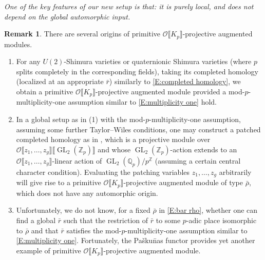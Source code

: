 \documentclass[12pt]{amsart}
\theoremstyle{definition}
\newtheorem{remark}[subsection]{Remark}
\numberwithin{equation}{subsection}
\def\calO{\mathcal{O}}
\def\QQ{\mathbb{Q}}
\def\ZZ{\mathbb{Z}}
\DeclareMathOperator{\GL}{GL}
\begin{document}
{\it One of the key features of our new setup is that: it is purely local, and does not depend on the global automorphic input.}
\begin{remark}
\label{R:origins of arithmetic modules}
There are several origins of primitive $\calO\llbracket K_p\rrbracket$-projective augmented modules.
\begin{enumerate}
\item For any $U(2)$-Shimura varieties or quaternionic Shimura varieties (where $p$ splits completely in the corresponding fields), taking its completed homology (localized at an appropriate $\bar r$) similarly to \eqref{E:completed homology}, we obtain a primitive $\calO\llbracket K_p\rrbracket$-projective augmented module provided a mod-$p$-multiplicity-one assumption similar to \eqref{E:multiplicity one} hold.

\item 
In a global setup as in (1) with the mod-$p$-multiplicity-one assumption, assuming some further Taylor--Wiles conditions, one may construct a patched completed homology as in \cite[\S\,2]{six author}, which is a projective module over $\calO\llbracket z_1, \dots, z_g\rrbracket \llbracket \GL_2(\ZZ_p)\rrbracket$ and whose $\GL_2(\ZZ_p)$-action extends to an $\calO\llbracket z_1, \dots, z_g\rrbracket$-linear action of $\GL_2(\QQ_p)/p^\ZZ$ (assuming a certain central character condition). Evaluating the patching variables $z_1, \dots, z_g$ arbitrarily will give rise to a primitive $\calO\llbracket K_p\rrbracket$-projective augmented module of type $\bar\rho$, which does not have any automorphic origin. 

\item Unfortunately, we do not know, for a fixed $\bar \rho$ in \eqref{E:bar rho}, whether one can find a global $\bar r$ such that the restriction of $\bar r$ to some $p$-adic place isomorphic to $\bar \rho$ and that $\bar r$ satisfies the mod-$p$-multiplicity-one assumption similar to \eqref{E:multiplicity one}. Fortunately, the Pa\v sku\=nas functor provides yet another example of primitive $\calO\llbracket K_p\rrbracket$-projective augmented module.


\end{enumerate}
\end{remark}
\end{document}
